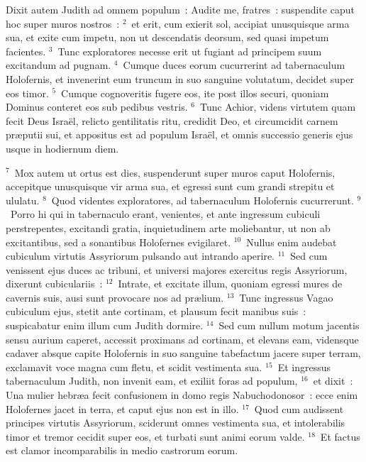 \bchapter
\lettrine[lines=3,image=true,loversize=0.05,lraise=-0.03]{D}{}ixit autem Judith ad omnem populum~: Audite me, fratres~: suspendite caput hoc super muros nostros~:
${}^{2}$~et erit, cum exierit sol, accipiat unusquisque arma sua, et exite cum impetu, non ut descendatis deorsum, sed quasi impetum facientes.
${}^{3}$~Tunc exploratores necesse erit ut fugiant ad principem suum excitandum ad pugnam.
${}^{4}$~Cumque duces eorum cucurrerint ad tabernaculum Holofernis, et invenerint eum truncum in suo sanguine volutatum, decidet super eos timor.
${}^{5}$~Cumque cognoveritis fugere eos, ite post illos securi, quoniam Dominus conteret eos sub pedibus vestris.
${}^{6}$~Tunc Achior, videns virtutem quam fecit Deus Isra\"el, relicto gentilitatis ritu, credidit Deo, et circumcidit carnem pr\ae putii sui, et appositus est ad populum Isra\"el, et omnis successio generis ejus usque in hodiernum diem.


${}^{7}$~Mox autem ut ortus est dies, suspenderunt super muros caput Holofernis, accepitque unusquisque vir arma sua, et egressi sunt cum grandi strepitu et ululatu.
${}^{8}$~Quod videntes exploratores, ad tabernaculum Holofernis cucurrerunt.
${}^{9}$~Porro hi qui in tabernaculo erant, venientes, et ante ingressum cubiculi perstrepentes, excitandi gratia, inquietudinem arte moliebantur, ut non ab excitantibus, sed a sonantibus Holofernes evigilaret.
${}^{10}$~Nullus enim audebat cubiculum virtutis Assyriorum pulsando aut intrando aperire.
${}^{11}$~Sed cum venissent ejus duces ac tribuni, et universi majores exercitus regis Assyriorum, dixerunt cubiculariis~:
${}^{12}$~Intrate, et excitate illum, quoniam egressi mures de cavernis suis, ausi sunt provocare nos ad pr\ae lium.
${}^{13}$~Tunc ingressus Vagao cubiculum ejus, stetit ante cortinam, et plausum fecit manibus suis~: suspicabatur enim illum cum Judith dormire.
${}^{14}$~Sed cum nullum motum jacentis sensu aurium caperet, accessit proximans ad cortinam, et elevans eam, vidensque cadaver absque capite Holofernis in suo sanguine tabefactum jacere super terram, exclamavit voce magna cum fletu, et scidit vestimenta sua.
${}^{15}$~Et ingressus tabernaculum Judith, non invenit eam, et exiliit foras ad populum,
${}^{16}$~et dixit~: Una mulier hebr\ae a fecit confusionem in domo regis Nabuchodonosor~: ecce enim Holofernes jacet in terra, et caput ejus non est in illo.
${}^{17}$~Quod cum audissent principes virtutis Assyriorum, sciderunt omnes vestimenta sua, et intolerabilis timor et tremor cecidit super eos, et turbati sunt animi eorum valde.
${}^{18}$~Et factus est clamor incomparabilis in medio castrorum eorum.

